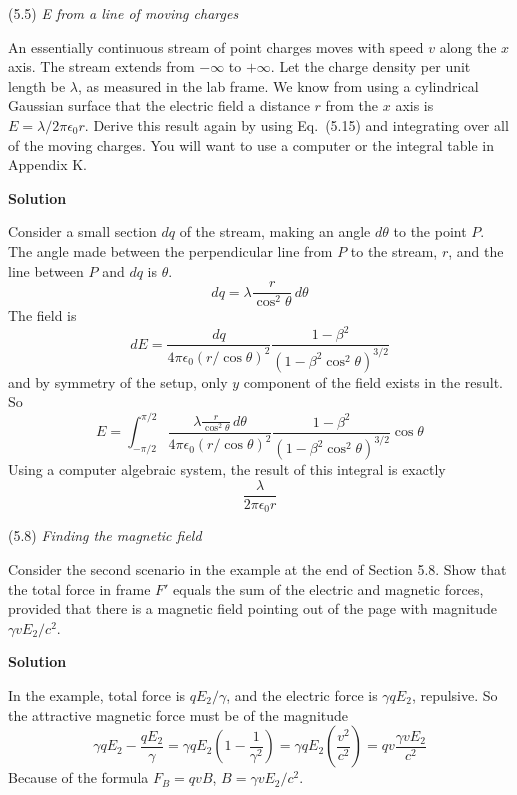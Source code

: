 \documentclass{article}
\begin{document}

\begin{homeworkProblem}
	(5.5) \textit{E from a line of moving charges}

	An essentially continuous stream of point charges moves with speed $v$ along the $x$ axis. The stream extends from $-\infty$ to $+\infty$. Let the charge density per unit length be $\lambda$, as measured in the lab frame. We know from using a cylindrical Gaussian surface that the electric field a distance $r$ from the $x$ axis is $E=\lambda/2\pi\epsilon_0r$. Derive this result again by using Eq.~(5.15) and integrating over all of the moving charges. You will want to use a computer or the integral table in Appendix K.

	\textbf{Solution}

	Consider a small section $dq$ of the stream, making an angle $d\theta$ to the point $P$. The angle made between the perpendicular line from $P$ to the stream, $r$, and the line between $P$ and $dq$ is $\theta$.
	\[
		dq=\lambda\frac{r}{\cos^2\theta}\,d\theta
	\]
	The field is
	\[
		dE=\frac{dq}{4\pi\epsilon_0(r/\cos\theta)^2}\frac{1-\beta^2}{\left(1-\beta^2\cos^2\theta\right)^{3/2}}
	\]
	and by symmetry of the setup, only $y$ component of the field exists in the result. So
	\[
		E=\int_{-\pi/2}^{\pi/2}\frac{\lambda\frac{r}{\cos^2\theta}\,d\theta}{4\pi\epsilon_0(r/\cos\theta)^2}\frac{1-\beta^2}{\left(1-\beta^2\cos^2\theta\right)^{3/2}}\cos\theta
	\]
	Using a computer algebraic system, the result of this integral is exactly
	\[
		\frac{\lambda}{2\pi \epsilon_0 r}
	\]
\end{homeworkProblem}


\begin{homeworkProblem}
	(5.8) \textit{Finding the magnetic field}
	
	Consider the second scenario in the example at the end of Section 5.8. Show that the total force in frame $F'$ equals the sum of the electric and magnetic forces, provided that there is a magnetic field pointing out of the page with magnitude $\gamma vE_2/c^2$.

	\textbf{Solution}

	In the example, total force is $qE_2/\gamma$, and the electric force is $\gamma qE_2$, repulsive. So the attractive magnetic force must be of the magnitude
	\[
		\gamma qE_2-\frac{qE_2}{\gamma}=\gamma qE_2\left(1-\frac{1}{\gamma^2}\right)=\gamma qE_2\left(\frac{v^2}{c^2}\right)=qv\frac{\gamma v E_2}{c^2}
	\]
	Because of the formula $F_B=qvB$, $B=\gamma vE_2/c^2$.
\end{homeworkProblem}
\end{document}
